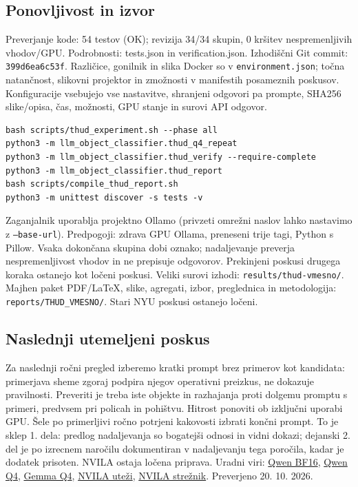 \documentclass[10pt,a4paper]{article}
\begin{document}
\subsection*{Ponovljivost in izvor}
Preverjanje kode: 54 testov (OK); revizija 34/34 skupin, 0 kršitev nespremenljivih vhodov/GPU. Podrobnosti: tests.json in verification.json. Izhodiščni Git commit: \texttt{399d6ea6c53f}. Različice, gonilnik in slika Docker so v \texttt{environment.json}; točna natančnost, slikovni projektor in zmožnosti v manifestih posameznih poskusov. Konfiguracije vsebujejo vse nastavitve, shranjeni odgovori pa prompte, SHA256 slike/opisa, čas, možnosti, GPU stanje in surovi API odgovor.
\begin{verbatim}
bash scripts/thud_experiment.sh --phase all
python3 -m llm_object_classifier.thud_q4_repeat
python3 -m llm_object_classifier.thud_verify --require-complete
python3 -m llm_object_classifier.thud_report
bash scripts/compile_thud_report.sh
python3 -m unittest discover -s tests -v
\end{verbatim}
Zaganjalnik uporablja projektno Ollamo (privzeti omrežni naslov lahko nastavimo z \texttt{--base-url}). Predpogoji: zdrava GPU Ollama, preneseni trije tagi, Python s Pillow. Vsaka dokončana skupina dobi oznako; nadaljevanje preverja nespremenljivost vhodov in ne prepisuje odgovorov. Prekinjeni poskusi drugega koraka ostanejo kot ločeni poskusi.
Veliki surovi izhodi: \texttt{results/thud-vmesno/}. Majhen paket PDF/LaTeX, slike, agregati, izbor, preglednica in metodologija: \texttt{reports/THUD\_VMESNO/}. Stari NYU poskusi ostanejo ločeni.
\subsection*{Naslednji utemeljeni poskus}
Za naslednji ročni pregled izberemo kratki prompt brez primerov kot kandidata: primerjava sheme zgoraj podpira njegov operativni preizkus, ne dokazuje pravilnosti. Preveriti je treba iste objekte in razhajanja proti dolgemu promptu s primeri, predvsem pri policah in pohištvu. Hitrost ponoviti ob izključni uporabi GPU. Šele po primerljivi ročno potrjeni kakovosti izbrati končni prompt. To je sklep 1. dela: predlog nadaljevanja so bogatejši odnosi in vidni dokazi; dejanski 2. del je po izrecnem naročilu dokumentiran v nadaljevanju tega poročila, kadar je dodatek prisoten. NVILA ostaja ločena priprava.
\vfill{\footnotesize Uradni viri: \href{https://ollama.com/library/qwen3.5:4b-bf16}{Qwen BF16}, \href{https://ollama.com/library/qwen3.5:4b-q4_K_M}{Qwen Q4}, \href{https://ollama.com/library/gemma3:4b-it-q4_K_M}{Gemma Q4}, \href{https://huggingface.co/Efficient-Large-Model/NVILA-8B}{NVILA uteži}, \href{https://github.com/NVlabs/VILA/blob/main/server.py}{NVILA strežnik}. Preverjeno 20. 10. 2026.}
\end{document}
